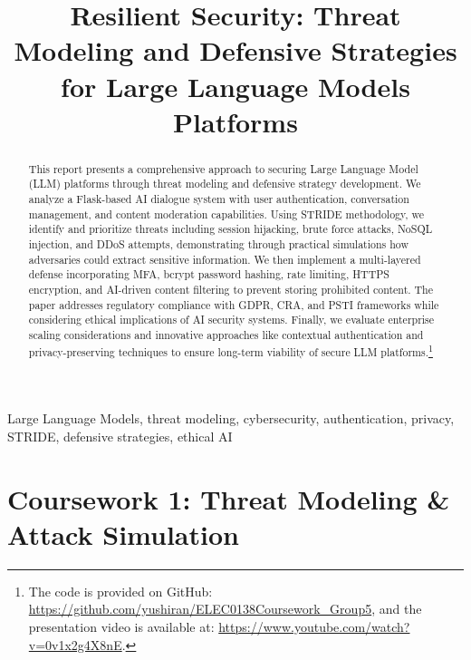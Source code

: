 \documentclass{article}
\title{Resilient Security: Threat Modeling and Defensive Strategies for Large Language Models Platforms}
\begin{document}
\maketitle
%
\begin{abstract}
    This report presents a comprehensive approach to securing Large Language Model (LLM) platforms through threat modeling and defensive strategy development. We analyze a Flask-based AI dialogue system with user authentication, conversation management, and content moderation capabilities. 
    Using STRIDE methodology, we identify and prioritize threats including session hijacking, brute force attacks, NoSQL injection, and DDoS attempts, demonstrating through practical simulations how adversaries could extract sensitive information. 
    We then implement a multi-layered defense incorporating MFA, bcrypt password hashing, rate limiting, HTTPS encryption, and AI-driven content filtering to prevent storing prohibited content. 
    The paper addresses regulatory compliance with GDPR\cite{GDPR2016}, CRA, and PSTI frameworks while considering ethical implications of AI security systems. 
    Finally, we evaluate enterprise scaling considerations and innovative approaches like contextual authentication and privacy-preserving techniques to ensure long-term viability of secure LLM platforms.\footnote{The code is provided on GitHub: \url{https://github.com/yushiran/ELEC0138Coursework\_Group5}, and the presentation video is available at: \url{https://www.youtube.com/watch?v=0v1x2g4X8nE}.}
\end{abstract}
%
\begin{keywords}
    Large Language Models, threat modeling, cybersecurity, authentication, privacy, STRIDE, defensive strategies, ethical AI
\end{keywords}

\section{Coursework 1: Threat Modeling \& Attack Simulation}
\end{document}
